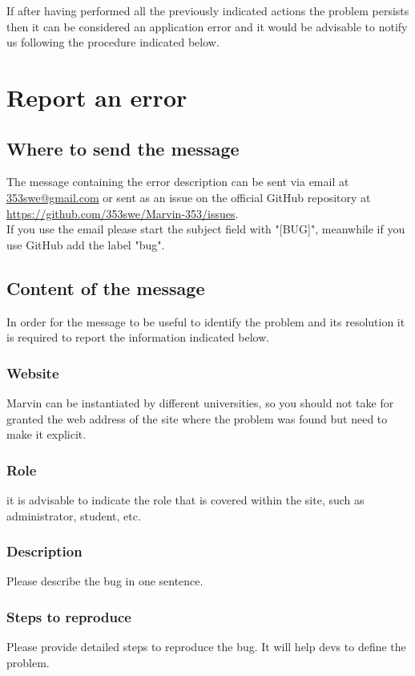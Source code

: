 \documentclass[ManualeUtente]{subfiles}
\begin{document}
If after having performed all the previously indicated actions the problem persists then it can be considered an application error and it would be advisable to notify us following the procedure indicated below.

\section{Report an error}
\subsection{Where to send the message}
The message containing the error description can be sent via email at \href{mailto: 353swe@gmail.com}{ 353swe@gmail.com} or sent as an issue on the official GitHub repository at \href{https://github.com/353swe/Marvin-353/issues}{https://github.com/353swe/Marvin-353/issues}. \\
If you use the email please start the subject field with "[BUG]", meanwhile if you use GitHub add the label "bug".

\subsection{Content of the message}
In order for the message to be useful to identify the problem and its resolution it is required to report the information indicated below.

\subsubsection{Website}
Marvin can be instantiated by different universities, so you should not take for granted the web address of the site where the problem was found but need to make it explicit.

\subsubsection{Role}
it is advisable to indicate the role that is covered within the site, such as administrator, student, etc.

\subsubsection{Description}
Please describe the bug in one sentence.

\subsubsection{Steps to reproduce}
Please provide detailed steps to reproduce the bug. It will help devs to define the problem.
\end{document}
